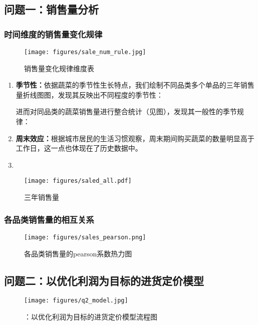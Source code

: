 \documentclass[withoutpreface,bwprint]{cumcmthesis} %
\begin{document}
\subsection{问题一：销售量分析}
\subsubsection{时间维度的销售量变化规律}
\begin{figure}[!h]
    \centering
    \texttt{[image: figures/sale\_num\_rule.jpg]}
    \caption{销售量变化规律维度表}
    \label{fig:N_purchase_rule}
\end{figure}
\begin{enumerate}
    \item \textbf{季节性：}依据蔬菜的季节性生长特点，我们绘制不同品类多个单品的三年销售量折线图图，发现其反映出不同程度的季节性：

进而对同品类的蔬菜销售量进行整合统计（见图），发现其一般性的季节规律：
    \item \textbf{周末效应：}根据城市居民的生活习惯观察，周末期间购买蔬菜的数量明显高于工作日，这一点也体现在了历史数据中。
    
    \item \textbf{}
\end{enumerate}



\begin{figure}[!h]
    \centering
    \texttt{[image: figures/saled\_all.pdf]}
    \caption{三年销售量}
    \label{fig:3years_saled}
\end{figure}

\subsubsection{各品类销售量的相互关系}
\begin{figure}[!h]
    \centering
    \texttt{[image: figures/sales\_pearson.png]}
    \caption{各品类销售量的pearson系数热力图}
    \label{fig:3years_saled}
\end{figure}
\subsection{问题二：以优化利润为目标的进货定价模型}
    \begin{figure}[!h]
    \centering
    \texttt{[image: figures/q2\_model.jpg]}
    \caption{：以优化利润为目标的进货定价模型流程图}
    \label{fig:q2_model}
\end{figure}
\end{document}
